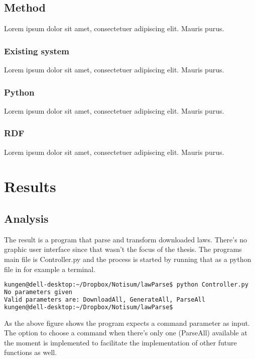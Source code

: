 \documentclass[a4paper,11pt]{kth-mag}
\begin{document}
\chapter{Method}

Lorem ipsum dolor sit amet, consectetuer adipiscing elit. Mauris
purus. 

\section{Existing system}

Lorem ipsum dolor sit amet, consectetuer adipiscing elit. Mauris
purus. 

\section{Python}

Lorem ipsum dolor sit amet, consectetuer adipiscing elit. Mauris
purus. 

\section{RDF}

Lorem ipsum dolor sit amet, consectetuer adipiscing elit. Mauris
purus. 

\part{Results}

\chapter{Analysis}

The result is a program that parse and transform downloaded laws. There’s no graphic user interface since that wasn’t the focus of the thesis. The programs main file is Controller.py and the process is started by running that as a python file in for example a terminal. 

\begin{lstlisting}[language=bash, caption=Command to run the program]
kungen@dell-desktop:~/Dropbox/Notisum/lawParse$ python Controller.py
No parameters given
Valid parameters are: DownloadAll, GenerateAll, ParseAll
kungen@dell-desktop:~/Dropbox/Notisum/lawParse$ 
\end{lstlisting}

As the above figure shows the program expects a command parameter as input. The option to choose a command when there’s only one (ParseAll) available at the moment is implemented to facilitate the implementation of other future functions as well. 
\end{document}
